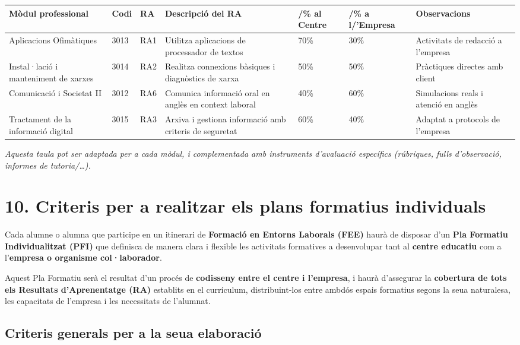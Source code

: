 \documentclass[
  paper=a4,
  ,captions=tableheading
]{scrartcl}
\begin{document}
\begin{longtable}[]{@{}lllllll@{}}
\toprule
\textbf{Mòdul professional} & \textbf{Codi} & \textbf{RA} &
\textbf{Descripció del RA} & /\% al Centre & /\% a l/'Empresa &
Observacions \\
\midrule
\endhead
Aplicacions Ofimàtiques & 3013 & RA1 & Utilitza aplicacions de
processador de textos & 70\% & 30\% & Activitats de redacció a
l'empresa \\
Instal·lació i manteniment de xarxes & 3014 & RA2 & Realitza connexions
bàsiques i diagnòstics de xarxa & 50\% & 50\% & Pràctiques directes amb
client \\
Comunicació i Societat II & 3012 & RA6 & Comunica informació oral en
anglès en context laboral & 40\% & 60\% & Simulacions reals i atenció en
anglès \\
Tractament de la informació digital & 3015 & RA3 & Arxiva i gestiona
informació amb criteris de seguretat & 60\% & 40\% & Adaptat a protocols
de l'empresa \\
\bottomrule
\end{longtable}

\emph{Aquesta taula pot ser adaptada per a cada mòdul, i complementada
amb instruments d'avaluació específics (rúbriques, fulls d'observació,
informes de tutoria/\ldots).}

\hypertarget{criteris-per-a-realitzar-els-plans-formatius-individuals}{%
\section{10. Criteris per a realitzar els plans formatius
individuals}\label{criteris-per-a-realitzar-els-plans-formatius-individuals}}

Cada alumne o alumna que participe en un itinerari de \textbf{Formació
en Entorns Laborals (FEE)} haurà de disposar d'un \textbf{Pla Formatiu
Individualitzat (PFI)} que definisca de manera clara i flexible les
activitats formatives a desenvolupar tant al \textbf{centre educatiu}
com a l'\textbf{empresa o organisme col·laborador}.

Aquest Pla Formatiu serà el resultat d'un procés de \textbf{codisseny
entre el centre i l'empresa}, i haurà d'assegurar la \textbf{cobertura
de tots els Resultats d'Aprenentatge (RA)} establits en el currículum,
distribuint-los entre ambdós espais formatius segons la seua naturalesa,
les capacitats de l'empresa i les necessitats de l'alumnat.

\hypertarget{criteris-generals-per-a-la-seua-elaboraciuxf3}{%
\subsection{Criteris generals per a la seua
elaboració}\label{criteris-generals-per-a-la-seua-elaboraciuxf3}}
\end{document}

